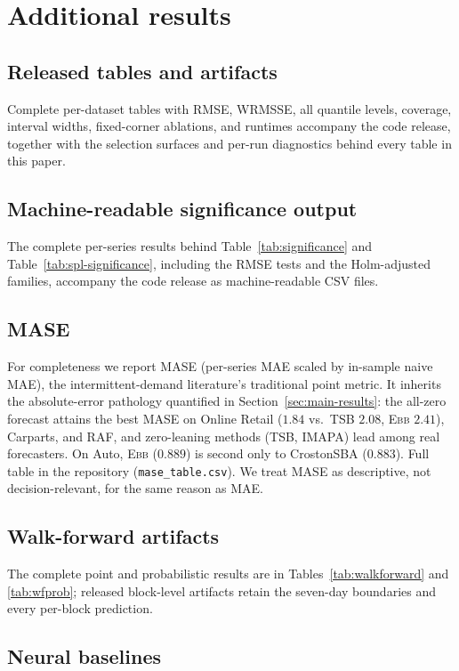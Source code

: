 \documentclass[twocolumn,10pt]{article}
\theoremstyle{definition}
\newcommand{\EBB}{\textsc{Ebb}}
\begin{document}
\section{Additional results}\label{app:extra}



\subsection{Released tables and artifacts}
Complete per-dataset tables with RMSE, WRMSSE, all quantile levels,
coverage, interval widths, fixed-corner ablations, and runtimes accompany
the code release, together with the selection surfaces and per-run
diagnostics behind every table in this paper.

\subsection{Machine-readable significance output}
The complete per-series results behind Table~\ref{tab:significance} and
Table~\ref{tab:spl-significance}, including the RMSE tests and the
Holm-adjusted families, accompany the code release as machine-readable
CSV files.

\subsection{MASE}
For completeness we report MASE (per-series MAE scaled by in-sample
naive MAE), the intermittent-demand literature's traditional point
metric. It inherits the absolute-error pathology quantified in
Section~\ref{sec:main-results}: the all-zero forecast attains the best
MASE on Online Retail ($1.84$ vs.\ TSB $2.08$, \EBB{} $2.41$),
Carparts, and RAF, and zero-leaning methods (TSB, IMAPA) lead among real
forecasters. On Auto, \EBB{} ($0.889$) is second only to CrostonSBA
($0.883$). Full table in the repository
(\texttt{mase\_table.csv}). We treat MASE as descriptive, not
decision-relevant, for the same reason as MAE.

\subsection{Walk-forward artifacts}
The complete point and probabilistic results are in
Tables~\ref{tab:walkforward} and \ref{tab:wfprob}; released block-level
artifacts retain the seven-day boundaries and every per-block prediction.

\subsection{Neural baselines}
\label{app:neural}
\end{document}
